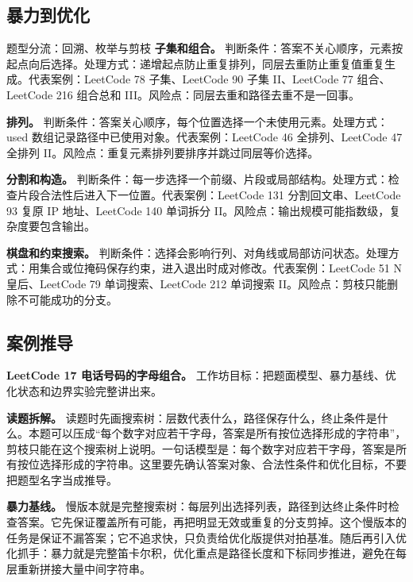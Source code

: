 \subsection{暴力到优化}

\begin{principlebox}{题型分流：回溯、枚举与剪枝}
\textbf{子集和组合。}
判断条件：答案不关心顺序，元素按起点向后选择。处理方式：递增起点防止重复排列，同层去重防止重复值重复生成。代表案例：LeetCode 78 子集、LeetCode 90 子集 II、LeetCode 77 组合、LeetCode 216 组合总和 III。风险点：同层去重和路径去重不是一回事。

\textbf{排列。}
判断条件：答案关心顺序，每个位置选择一个未使用元素。处理方式：used 数组记录路径中已使用对象。代表案例：LeetCode 46 全排列、LeetCode 47 全排列 II。风险点：重复元素排列要排序并跳过同层等价选择。

\textbf{分割和构造。}
判断条件：每一步选择一个前缀、片段或局部结构。处理方式：检查片段合法性后进入下一位置。代表案例：LeetCode 131 分割回文串、LeetCode 93 复原 IP 地址、LeetCode 140 单词拆分 II。风险点：输出规模可能指数级，复杂度要包含输出。

\textbf{棋盘和约束搜索。}
判断条件：选择会影响行列、对角线或局部访问状态。处理方式：用集合或位掩码保存约束，进入退出时成对修改。代表案例：LeetCode 51 N 皇后、LeetCode 79 单词搜索、LeetCode 212 单词搜索 II。风险点：剪枝只能删除不可能成功的分支。

\end{principlebox}

\subsection{案例推导}

\noindent\textbf{LeetCode 17 电话号码的字母组合。} 工作坊目标：把题面模型、暴力基线、优化状态和边界实验完整讲出来。

\textbf{读题拆解。} 读题时先画搜索树：层数代表什么，路径保存什么，终止条件是什么。本题可以压成“每个数字对应若干字母，答案是所有按位选择形成的字符串”，剪枝只能在这个搜索树上说明。一句话模型是：每个数字对应若干字母，答案是所有按位选择形成的字符串。这里要先确认答案对象、合法性条件和优化目标，不要把题型名字当成推导。

\textbf{暴力基线。} 慢版本就是完整搜索树：每层列出选择列表，路径到达终止条件时检查答案。它先保证覆盖所有可能，再把明显无效或重复的分支剪掉。这个慢版本的任务是保证不漏答案；它不追求快，只负责给优化版提供对拍基准。随后再引入优化抓手：暴力就是完整笛卡尔积，优化重点是路径长度和下标同步推进，避免在每层重新拼接大量中间字符串。

